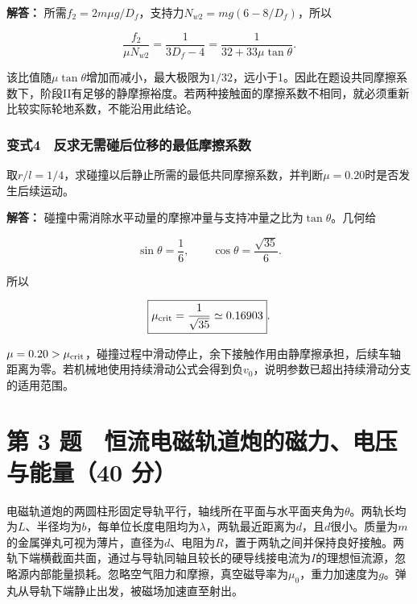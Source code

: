 \documentclass[12pt,a4paper,fontset=fandol]{ctexart}
\begin{document}
\textbf{解答：}
所需\(f_2=2m\mu g/D_f\)，支持力\(N_{w2}=mg(6-8/D_f)\)，所以

\[
\frac{f_2}{\mu N_{w2}}=\frac1{3D_f-4}
=\frac1{32+33\mu\tan\theta}.
\]

该比值随\(\mu\tan\theta\)增加而减小，最大极限为\(1/32\)，远小于1。因此在题设共同摩擦系数下，阶段II有足够的静摩擦裕度。若两种接触面的摩擦系数不相同，就必须重新比较实际轮地系数，不能沿用此结论。

\par\noindent\begin{minipage}{\linewidth}
\subsubsection{变式4　反求无需碰后位移的最低摩擦系数}\label{ux53d8ux5f0f4-ux53cdux6c42ux65e0ux9700ux78b0ux540eux4f4dux79fbux7684ux6700ux4f4eux6469ux64e6ux7cfbux6570}

取\(r/l=1/4\)，求碰撞以后静止所需的最低共同摩擦系数，并判断\(\mu=0.20\)时是否发生后续运动。

\textbf{解答：}
碰撞中需消除水平动量的摩擦冲量与支持冲量之比为\(\tan\theta\)。几何给

\[
\sin\theta=\frac16,\qquad
\cos\theta=\frac{\sqrt{35}}6.
\]

所以

\[
\boxed{\mu_{\rm crit}=\frac1{\sqrt{35}}\simeq0.16903}.
\]

\(\mu=0.20>\mu_{\rm crit}\)，碰撞过程中滑动停止，余下接触作用由静摩擦承担，后续车轴距离为零。若机械地使用持续滑动公式会得到负\(v_0\)，说明参数已超出持续滑动分支的适用范围。

\end{minipage}\par
\clearpage

\section{第 3 题　恒流电磁轨道炮的磁力、电压与能量（40
分）}\label{ux7b2c-3-ux9898-ux6052ux6d41ux7535ux78c1ux8f68ux9053ux70aeux7684ux78c1ux529bux7535ux538bux4e0eux80fdux91cf40-ux5206}

电磁轨道炮的两圆柱形固定导轨平行，轴线所在平面与水平面夹角为\(\theta\)。两轨长均为\(L\)、半径均为\(b\)，每单位长度电阻均为\(\lambda\)，两轨最近距离为\(d\)，且\(d\)很小。质量为\(m\)的金属弹丸可视为薄片，直径为\(d\)、电阻为\(R\)，置于两轨之间并保持良好接触。两轨下端横截面共面，通过与导轨同轴且较长的硬导线接电流为\(I\)的理想恒流源，忽略源内部能量损耗。忽略空气阻力和摩擦，真空磁导率为\(\mu_0\)，重力加速度为\(g\)。弹丸从导轨下端静止出发，被磁场加速直至射出。
\end{document}
